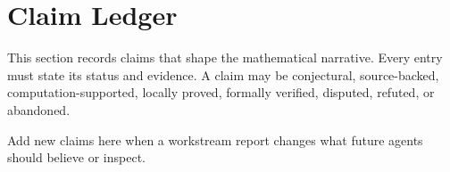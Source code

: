 \section{Claim Ledger}

This section records claims that shape the mathematical narrative. Every entry must
state its status and evidence. A claim may be conjectural, source-backed,
computation-supported, locally proved, formally verified, disputed, refuted, or
abandoned.

\begin{claimledger}
\end{claimledger}

Add new claims here when a workstream report changes what future agents should believe
or inspect.

